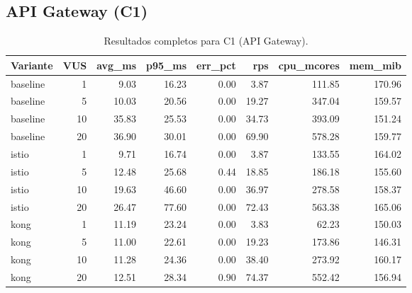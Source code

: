\subsection{API Gateway (C1)}
\begin{table}[htbp]
\centering
\small
\caption{Resultados completos para C1 (API Gateway).}
\label{tab:s2-c1}
\begin{tabular}{lrrrrrrr}
\toprule
Variante & VUS & avg\_ms & p95\_ms & err\_pct & rps & cpu\_mcores & mem\_mib \\
\midrule
baseline & 1  & 9.03  & 16.23 & 0.00 & 3.87  & 111.85 & 170.96 \\
baseline & 5  & 10.03 & 20.56 & 0.00 & 19.27 & 347.04 & 159.57 \\
baseline & 10 & 35.83 & 25.53 & 0.00 & 34.73 & 393.09 & 151.24 \\
baseline & 20 & 36.90 & 30.01 & 0.00 & 69.90 & 578.28 & 159.77 \\
istio    & 1  & 9.71  & 16.74 & 0.00 & 3.87  & 133.55 & 164.02 \\
istio    & 5  & 12.48 & 25.68 & 0.44 & 18.85 & 186.18 & 155.60 \\
istio    & 10 & 19.63 & 46.60 & 0.00 & 36.97 & 278.58 & 158.37 \\
istio    & 20 & 26.47 & 77.60 & 0.00 & 72.43 & 563.38 & 165.06 \\
kong     & 1  & 11.19 & 23.24 & 0.00 & 3.83  & 62.23  & 150.03 \\
kong     & 5  & 11.00 & 22.61 & 0.00 & 19.23 & 173.86 & 146.31 \\
kong     & 10 & 11.28 & 24.36 & 0.00 & 38.40 & 273.92 & 160.17 \\
kong     & 20 & 12.51 & 28.34 & 0.90 & 74.37 & 552.42 & 156.94 \\
\bottomrule
\end{tabular}
\end{table}

